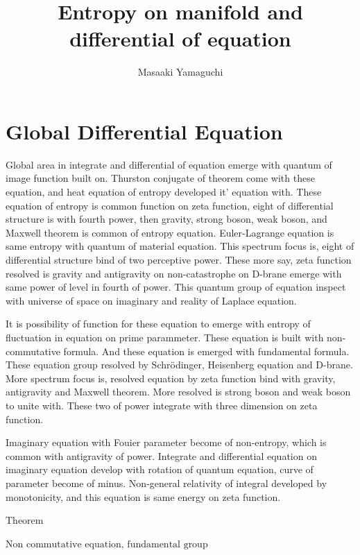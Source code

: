 \documentclass{jsarticle}
\begin{document}
\title{Entropy on manifold and differential of equation}
\author{Masaaki Yamaguchi}
\date{}
\maketitle

\section{Global Differential Equation}

  Global area in integrate and differential of equation emerge with quantum of image function built on.
Thurston conjugate of theorem come with these equation, and heat equation of entropy developed it' equation with.
These equation of entropy is common function on zeta function, eight of differential structure is with fourth
power, then gravity, strong boson, weak boson, and Maxwell theorem is common of entropy equation.
Euler-Lagrange equation is same entropy with quantum of material equation. This spectrum focus is,
eight of differential structure bind of two perceptive power. These more say, zeta function resolved is gravity
and antigravity on non-catastrophe on D-brane emerge with same power of level in fourth of power. This quantum
group of equation inspect with universe of space on imaginary and reality of Laplace equation.

  It is possibility of function for these equation to emerge with entropy of fluctuation in equation on prime 
parammeter. These equation is built with non-commutative formula. And these equation is emerged with fundamental
formula. These equation group resolved by Schr\"{o}dinger, Heisenberg equation and D-brane.
More spectrum focus is, resolved equation by zeta function bind with gravity, antigravity and Maxwell theorem.
More resolved is strong boson and weak boson to unite with. These two of power integrate with three dimension
on zeta function.

  Imaginary equation with Fouier parameter become of non-entropy, which is common with antigravity of power.
Integrate and differential equation on imaginary equation develop with rotation of quantum equation, curve of
parameter become of minus. Non-general relativity of integral developed by monotonicity, and this equation
is same energy on zeta function.




$\text{Theorem} $

$\text{Non commutative equation, fundamental group}$
	
\end{document}
